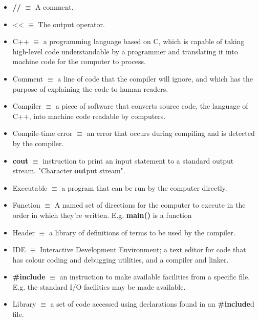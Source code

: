 \documentclass[12pt]{article}
\begin{document}
\begin{itemize}
\item \textbf{//} $\equiv$ A comment.

\item << $\equiv$ The output operator.

\item C++ $\equiv$ a programming language based on C, which is capable of taking high-level code understandable by a programmer and translating it into machine code for the computer to process.

\item Comment $\equiv$ a line of code that the compiler will ignore, and which has the purpose of explaining the code to human readers.

\item Compiler $\equiv$ a piece of software that converts source code, the language of C++, into machine code readable by computers.

\item Compile-time error $\equiv$ an error that occurs during compiling and is detected by the compiler.

\item \textbf{cout} $\equiv$ instruction to print an input statement to a standard output stream. "Character \textbf{out}put stream".

\item Executable $\equiv$ a program that can be run by the computer directly.

\item Function $\equiv$ A named set of directions for the computer to execute in the order in which they're written. E.g. \textbf{main()} is a function

\item Header $\equiv$ a library of definitions of terms to be used by the compiler.

\item IDE $\equiv$ Interactive Development Environment; a text editor for code that has colour coding and debugging utilities, and a compiler and linker.

\item \textbf{\#include} $\equiv$ an instruction to make available facilities from a specific file. E.g. the standard I/O facilities may be made available.

\item Library $\equiv$ a set of code accessed using declarations found in an \textbf{\#include}d file.


\end{itemize}
\end{document}

